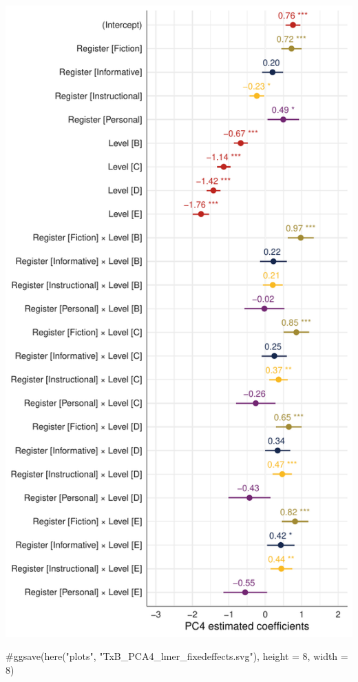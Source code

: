 \documentclass[
  letterpaper,
  DIV=11,
  numbers=noendperiod]{scrreprt}
\newenvironment{Shaded}{\begin{snugshade}}{\end{snugshade}}
\newcommand{\CommentTok}[1]{\textcolor[rgb]{0.37,0.37,0.37}{#1}}
\begin{document}
\includegraphics{E_Ch6_Analysis_files/figure-pdf/Dim4model-1.pdf}

\begin{Shaded}
\begin{Highlighting}[]
\CommentTok{\#ggsave(here("plots", "TxB\_PCA4\_lmer\_fixedeffects.svg"), height = 8, width = 8)}
\end{Highlighting}
\end{Shaded}
\end{document}
